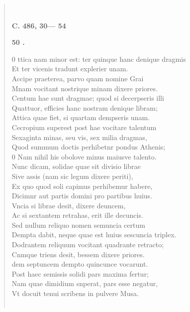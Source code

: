 \documentclass[11pt, a4paper]{report}
\begin{document}
\begin{verse}
        ﻿\pagebreak 
     \marginpar{[21]} \begin{center} \textbf{C. 486, 30— 54} \end{center}\begin{center} \textbf{50 .} \end{center}0 ttica nam minor est: ter quinque hanc denique dragmis \\ Et ter vicenis tradunt explerier unam. \\ Accipe praeterea, parvo quam nomine Grai \\ Mnam vocitant nostrique minam dixere priores. \\ Centum hae sunt dragmae; quod si decerpseris illi \\ Quattuor, efficies hanc nostram denique libram; \\ Attica quae fiet, si quartam dempseris unam. \\ Cecropium superest post hae vocitare talentum \\ Sexaginta minas, seu vis, sex milia dragmas, \\ Quod summum doctis perhibetnr pondus Athenis; \\ 0 Nam nihil his obolove minus maiusve talento. \\ Nunc dicam, solidae quae sit divisio librae \\ Sive assis (nam sic legum dixere periti), \\ Ex quo quod soli capimus perhibemur habere, \\ Dicimnr aut partis domini pro partibus huius. \\ Vncia si librae desit, dixere deuncem, \\ Ac si sextantem retrahas, erit ille decuncis. \\ Sed nullum reliquo nomen semuncia certum \\ Dempta dabit, neque  \lbrack quae \rbrack  est huius sescuncia triplex. \\ Dodrantem reliquum vocitant quadrante retracto; \\ Cnmque triens desit, bessem dixere priores. \\ dem septuncem dempto quincunce vocarunt. \\ Post haec semissis solidi pars maxima fertur; \\ Nam quae dimidium snperat, pars esse negatur, \\ Vt docuit tenui scribens in pulvere Musa. \\ 
        ﻿\pagebreak 

\end{verse}
\end{document}
